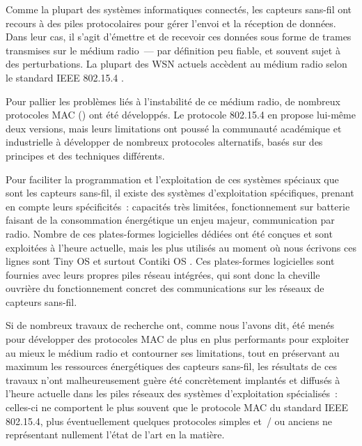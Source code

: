 
\bigskip

Comme la plupart des systèmes informatiques connectés, les capteurs sans-fil
ont recours à des piles protocolaires pour gérer l'envoi et la réception de
données. Dans leur cas, il s'agit d'émettre et de recevoir ces données
sous forme de trames transmises sur le médium radio~--- par définition peu
fiable, et souvent sujet à des perturbations. La plupart des WSN actuels
accèdent au médium radio selon le standard IEEE 802.15.4
\cite{IEEE802154-2011}.

Pour pallier les problèmes liés à l'instabilité de ce médium radio, de
nombreux protocoles MAC () ont été
développés. Le protocole 802.15.4 en propose lui-même deux versions,
mais leurs limitations ont poussé la communauté académique et industrielle
à développer de nombreux protocoles alternatifs, basés sur des principes
et des techniques différents.

\medskip

Pour faciliter la programmation et l'exploitation de ces systèmes spéciaux
que sont les capteurs sans-fil, il existe des systèmes d'exploitation
spécifiques, prenant en compte leurs spécificités~: capacités très limitées,
fonctionnement sur batterie faisant de la consommation énergétique un
enjeu majeur, communication par radio. Nombre de ces plates-formes
logicielles dédiées ont été conçues et sont exploitées à l'heure actuelle,
mais les plus utilisés au moment où nous écrivons ces lignes sont
Tiny OS \cite{TinyOS} et surtout Contiki OS \cite{ContikiOS}.
Ces plates-formes logicielles sont fournies avec leurs propres piles
réseau intégrées, qui sont donc la cheville ouvrière du fonctionnement
concret des communications sur les réseaux de capteurs sans-fil.

\newpage

Si de nombreux travaux de recherche ont, comme nous l'avons dit, été
menés pour développer des protocoles MAC de plus en plus performants
pour exploiter au mieux le médium radio et contourner ses limitations,
tout en préservant au maximum les ressources énergétiques des capteurs
sans-fil, les résultats de ces travaux n'ont malheureusement guère
été concrètement implantés et diffusés à l'heure actuelle dans les piles
réseaux des systèmes d'exploitation spécialisés~: celles-ci ne comportent
le plus souvent que le protocole MAC du standard IEEE 802.15.4, plus
éventuellement quelques protocoles simples et~/ ou anciens ne représentant
nullement l'état de l'art en la matière.

